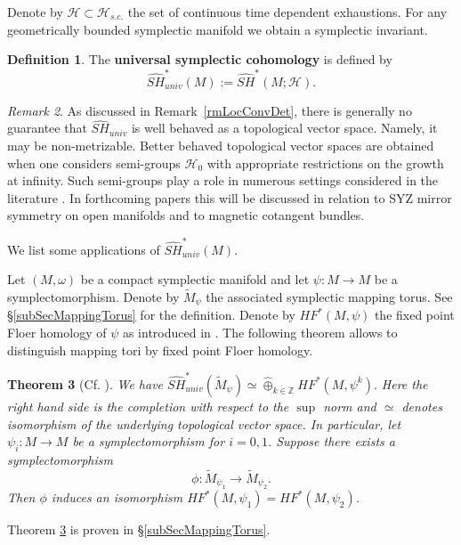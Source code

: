 \documentclass[11pt]{amsart}
\newcommand{\Z}{\mathbb{Z}}
\newtheorem{tm}{Theorem}[section]
\theoremstyle{definition}
\newtheorem{df}[tm]{Definition}
\theoremstyle{remark}
\newtheorem{rem}[tm]{Remark}
\begin{document}
Denote by $\mathcal{H}\subset\mathcal{H}_{s.c.}$ the set of continuous time dependent exhaustions. For any geometrically bounded symplectic manifold we obtain a symplectic invariant.
\begin{df}
The \textbf{universal symplectic cohomology} is defined by
\[
\widehat{SH}^*_{univ}(M):=\widehat{SH}^*(M;\mathcal{H}).
\]
\end{df}
\begin{rem}
As discussed in Remark~\ref{rmLocConvDet}, there is generally no guarantee that $\widehat{SH}_{univ}$ is well behaved as a topological vector space. Namely, it may be non-metrizable. Better behaved topological vector spaces are obtained when one considers semi-groups $\mathcal{H}_0$ with appropriate restrictions on the growth at infinity. Such semi-groups play a role in numerous settings considered in the literature \cite{Viterbo99,Oancea06,Ritter10}. In forthcoming papers this will be discussed in relation to SYZ mirror symmetry on open manifolds and to magnetic cotangent bundles.
\end{rem}
We list some applications of $\widehat{SH}^*_{univ}(M)$.

Let $(M,\omega)$ be a compact symplectic manifold and let $\psi:M\to M$ be a symplectomorphism. Denote by $\tilde{M}_\psi$ the associated symplectic mapping torus. See \S\ref{subSecMappingTorus} for the definition. Denote by $HF^*(M,\psi)$ the fixed point Floer homology of $\psi$ as introduced in \cite{DS94}. The following theorem allows to distinguish mapping tori by fixed point Floer homology.

\begin{tm}[Cf.  \cite{Fabert10}]\label{tmMappFloFixed}
We have $\widehat{SH}^*_{univ}(\tilde{M}_\psi)\simeq\hat{\oplus
}_{k\in\Z }HF^*(M,\psi^k).$ Here the right hand side is the completion with respect to the $\sup$ norm and $\simeq$ denotes isomorphism of the underlying topological vector space. In particular, let $\psi_i:M\to M$ be a symplectomorphism for $i=0,1$. Suppose there exists a symplectomorphism
\[
 \phi:\tilde{M}_{\psi_1}\to\tilde{M}_{\psi_2}.
 \]
 Then $\phi$ induces an isomorphism $HF^*(M,\psi_1)=HF^*(M,\psi_2)$.
\end{tm}
Theorem \ref{tmMappFloFixed} is proven in \S \ref{subSecMappingTorus}.
\end{document}
